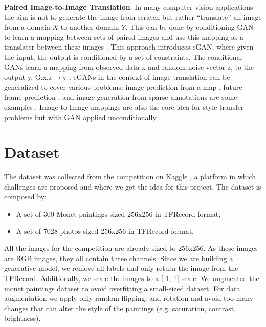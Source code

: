 \documentclass[10pt,twocolumn,letterpaper]{article}
\begin{document}
\textbf{Paired Image-to-Image Translation}. In many computer vision applications the aim is not to generate the image from scratch but rather “translate” an image from a domain $X$ to another domain $Y$. This can be done by conditioning GAN to learn a mapping between sets of paired images and use this mapping as a translater between these images \cite{imgtoimg}. This approach introduces cGAN, where given the input, the output is conditioned by a set of constraints. The conditional GANs learn a mapping from observed data x and random noise vector z, to the output y, G:{x,z}$\rightarrow$y \cite{imgtoimg}.  cGANs in the context of image translation can be generalized to cover various problems: image prediction from a map \cite{example1}, future frame prediction \cite{example2}, and image generation from sparse annotations are some examples \cite{example3}. Image-to-Image mappings are also the core idea for style transfer problems but with GAN applied unconditionally \cite{example4}.

\section{Dataset}

The dataset was collected from the competition on Kaggle \cite{kaggle}, a platform in which challenges are proposed and where we got the idea for this project. The dataset is composed by:
\begin{itemize}
\item A set of 300 Monet paintings sized 256x256 in TFRecord format;
\item A set of 7028 photos sized 256x256 in TFRecord format.
\end{itemize}
All the images for the competition are already sized to 256x256. As these images are RGB images, they all contain three channels. Since we are building a generative model, we remove all labels and only return the image from the TFRecord. Additionally, we scale the images to a [-1, 1] scale. We augmented the monet paintings dataset to avoid overfitting a small-sized dataset. For data augmentation we apply only random flipping, and rotation and avoid too many changes that can alter the style of the paintings (e.g. saturation, contrast, brightness).
\end{document}
